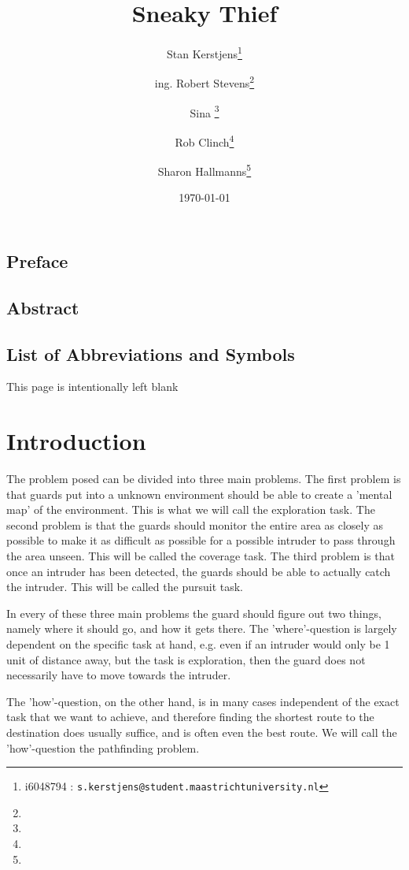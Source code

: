 \documentclass{report}
\title{Sneaky Thief}
\author{Stan Kerstjens\thanks{i6048794 : \texttt{s.kerstjens@student.maastrichtuniversity.nl}}}
\author{ing. Robert Stevens\thanks{}} %
\author{Sina \thanks{}} %
\author{Rob Clinch\thanks{}}
\author{Sharon Hallmanns\thanks{}} %
\affil{Department of Knowledge Engineering, Maastricht University}
\date{\today}
\begin{document}
\maketitle
{}
\section*{Preface}
\section*{Abstract}
\listoffigures
\section*{List of Abbreviations and Symbols}
\tableofcontents\newpage



\newpage
\begin{center} This page is intentionally left blank \end{center}
\newpage

\chapter{Introduction}
	The problem posed can be divided into three main problems. The first problem is that guards put into a unknown environment should be able to create a 'mental map' of the environment. This is what we will call the exploration task. The second problem is that the guards should monitor the entire area as closely as possible to make it as difficult as possible for a possible intruder to pass through the area unseen. This will be called the coverage task. The third problem is that once an intruder has been detected, the guards should be able to actually catch the intruder. This will be called the pursuit task.

	In every of these three main problems the guard should figure out two things, namely where it should go, and how it gets there. The 'where'-question is largely dependent on the specific task at hand, e.g. even if an intruder would only be 1 unit of distance away, but the task is exploration, then the guard does not necessarily have to move towards the intruder.

	The 'how'-question, on the other hand, is in many cases independent of the exact task that we want to achieve, and therefore finding the shortest route to the destination does usually suffice, and is often even the best route. We will call the 'how'-question the pathfinding problem.
\end{document}
